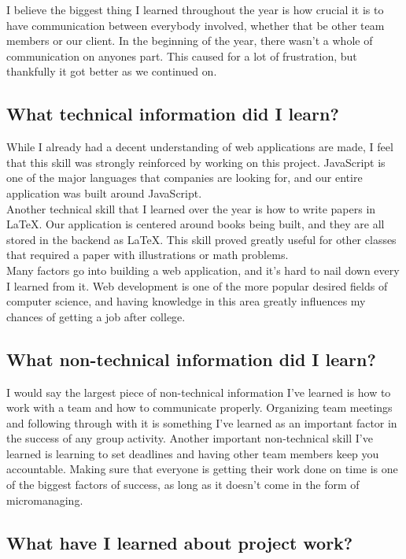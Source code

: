 \documentclass[onecolumn, draftclsnofoot,10pt, compsoc]{IEEEtran}
\begin{document}
I believe the biggest thing I learned throughout the year is how crucial it is to have communication between everybody involved, whether that be other team members or our client. In the beginning of the year, there wasn't a whole of communication on anyones part. This caused for a lot of frustration, but thankfully it got better as we continued on.

\subsection{What technical information did I learn?}

While I already had a decent understanding of web applications are made, I feel that this skill was strongly reinforced by working on this project. JavaScript is one of the major languages that companies are looking for, and our entire application was built around JavaScript. \\

Another technical skill that I learned over the year is how to write papers in LaTeX. Our application is centered around books being built, and they are all stored in the backend as LaTeX. This skill proved greatly useful for other classes that required a paper with illustrations or math problems. \\

Many factors go into building a web application, and it's hard to nail down every I learned from it. Web development is one of the more popular desired fields of computer science, and having knowledge in this area greatly influences my chances of getting a job after college. 

\subsection{What non-technical information did I learn?}

I would say the largest piece of non-technical information I've learned is how to work with a team and how to communicate properly. Organizing team meetings and following through with it is something I've learned as an important factor in the success of any group activity. Another important non-technical skill I've learned is learning to set deadlines and having other team members keep you accountable. Making sure that everyone is getting their work done on time is one of the biggest factors of success, as long as it doesn't come in the form of micromanaging.

\subsection{What have I learned about project work?}
\end{document}
